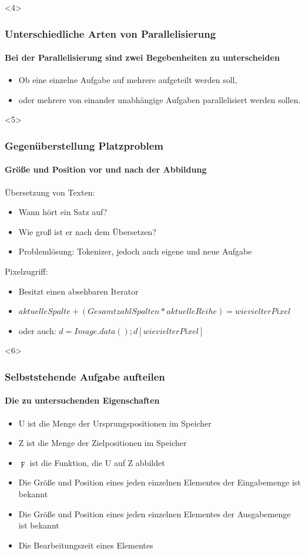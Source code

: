 \documentclass{beamer}
\begin{document}
\begin{frame}<4>
  \frametitle{Unterschiedliche Arten von Parallelisierung}
  \framesubtitle{Bei der Parallelisierung sind zwei Begebenheiten zu unterscheiden}
  \begin{itemize}
    \item Ob eine einzelne Aufgabe auf mehrere aufgeteilt werden soll, 
    \item oder mehrere von einander unabhängige Aufgaben parallelisiert werden sollen.
  \end{itemize}

\end{frame}

\begin{frame}<5>
  \frametitle{Gegenüberstellung Platzproblem}
  \framesubtitle{Größe und Position vor und nach der Abbildung}
  Übersetzung von Texten:
  \begin{itemize}
    \item  Wann hört ein Satz auf? 
    \item  Wie groß ist er nach dem Übersetzen? 
    \item  Problemlösung: Tokenizer, jedoch auch eigene und neue Aufgabe
  \end{itemize}
  
  Pixelzugriff:
  \begin{itemize}
    \item  Besitzt einen absehbaren Iterator
    \item  $aktuelle Spalte+(Gesamtzahl Spalten*aktuelle Reihe) = wievielter Pixel$
    \item  oder auch: $d = Image.data(); d[wievielter Pixel]$
  \end{itemize}
  
\end{frame}

\begin{frame}<6>
  \frametitle{Selbststehende Aufgabe aufteilen}
  \framesubtitle{Die zu untersuchenden Eigenschaften}

  \begin{itemize}
    \item U ist die Menge der Ursprungspositionen im Speicher
    \item Z ist die Menge der Zielpositionen im Speicher
    \item $\digamma$ ist die Funktion, die U auf Z abbildet
  \end{itemize}

  \begin{itemize}
    \item Die Größe und Position eines jeden einzelnen Elementes der Eingabemenge ist bekannt
    \item Die Größe und Position eines jeden einzelnen Elementes der Ausgabemenge ist bekannt
    \item Die Bearbeitungszeit eines Elementes
  \end{itemize}

\end{frame}
\end{document}

